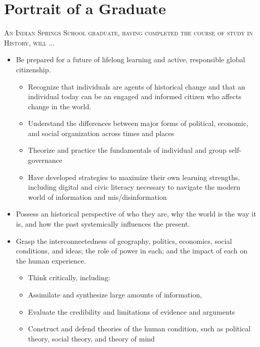 \section{Portrait of a Graduate}

\textsc{An Indian Springs School graduate, having completed the course of study in History, will} $\ldots$ 

\begin{itemize}


  \item Be prepared for a future of lifelong learning and active, responsible global citizenship.
\begin{itemize}
  \item Recognize that individuals are agents of historical change and that an individual today can be an engaged and informed citizen who affects change in the world.

  \item Understand the differences between major forms of political, economic, and social organization across times and places
  \item Theorize and practice the fundamentals of individual and group self-governance
  \item Have developed strategies to maximize their own learning strengths, including digital and civic literacy necessary to navigate the modern world of information and mis/disinformation  

\end{itemize}
  \item Possess an historical perspective of who they are, why the world is the way it is, and how the past systemically influences the present.

  \item Grasp the interconnectedness of geography, politics, economics, social conditions, and ideas; the role of power in each; and the impact of each on the human experience.  
\begin{itemize}

      \item Think critically, including:

      \item Assimilate and synthesize large amounts of information,
      
      \item Evaluate the credibility and limitations of evidence and arguments
      
      \item Construct and defend theories of the human condition, such as political theory, social theory, and theory of mind
      

\end{itemize}
\end{itemize}
